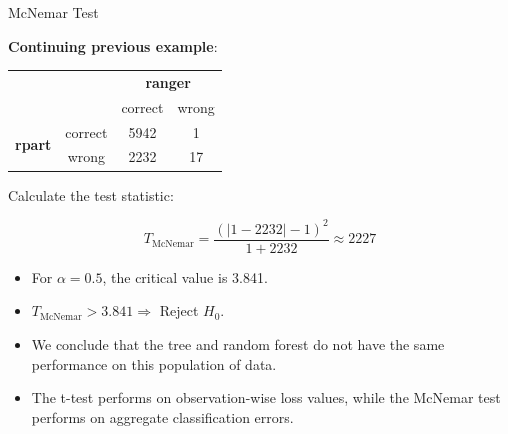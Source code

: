 \documentclass[11pt,compress,t,notes=noshow, aspectratio=169, xcolor=table]{beamer}
\begin{document}





\begin{frame}{McNemar Test}

\textbf{Continuing previous example}:

\begin{center}
  \begin{tabular}{cc|cc}
      & & \multicolumn{2}{c}{\textbf{ranger}} \\
      & & correct & wrong \\
      \hline
      \multirow{2}{*}{\textbf{rpart}} & correct & 5942 & 1 \\
      & wrong & 2232 & 17 \\
  \end{tabular}
\end{center}

Calculate the test statistic:

$$T_{\text{McNemar}} =  \frac{(|1 - 2232| - 1)^2}{1 + 2232} \approx 2227
$$
\begin{itemize}
    \item For $\alpha = 0.5$, the critical value is 3.841.
    \item $T_{\text{McNemar}} > 3.841 \Rightarrow$ Reject $H_0$.
    \item We conclude that the tree and random forest do not have the same performance on this population of data.
    \item The t-test performs on observation-wise loss values, while the McNemar test performs on aggregate classification errors.
\end{itemize}

\end{frame}
\end{document}
